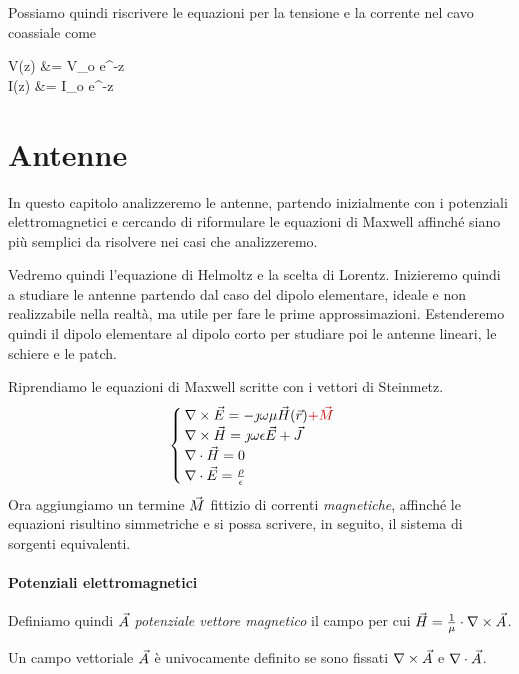 Possiamo quindi riscrivere le equazioni per la tensione e la corrente nel cavo coassiale come
\begin{esp}
	V(z) &= V_o \cdot e^{-\jmath \beta \cdot z}\\
	I(z) &= I_o \cdot e^{-\jmath \beta \cdot z}
\end{esp}

\chapter{Antenne}
In questo capitolo analizzeremo le antenne, partendo inizialmente con i potenziali elettromagnetici e cercando di riformulare le equazioni di Maxwell affinché siano più semplici da risolvere nei casi che analizzeremo.

Vedremo quindi l'equazione di Helmoltz e la scelta di Lorentz. Inizieremo quindi a studiare le antenne partendo dal caso del dipolo elementare, ideale e non realizzabile nella realtà, ma utile per fare le prime approssimazioni. Estenderemo quindi il dipolo elementare al dipolo corto per studiare poi le antenne lineari, le schiere e le patch.

Riprendiamo le equazioni di Maxwell scritte con i vettori di Steinmetz.
\begin{equation}\label{eq:maxw-ant}\begin{cases}
	\rot\E = -\jmath \omega \mu\H(\r) \textcolor[rgb]{0.8,0,0}{+ \M} \\
	\rot\H = \jmath \omega \epsilon \E + \J\\
	\diverg\H=0\\
	\diverg \E = \frac{\rho}{\epsilon}
\end{cases}\end{equation}
Ora aggiungiamo un termine $\vec{M}$ fittizio di correnti \emph{magnetiche}, affinché le equazioni risultino simmetriche e si possa scrivere, in seguito, il sistema di sorgenti equivalenti.

\subsubsection{Potenziali elettromagnetici}
Definiamo quindi $\vec{A}$ \emph{potenziale vettore magnetico} il campo per cui $\vec{H} = \frac{1}{\mu} \cdot \nabla\times \vec{A}$.

\begin{theorem}
	Un campo vettoriale $\vec{A}$ è univocamente definito se sono fissati $\nabla\times \vec{A}$ e $\nabla\cdot \vec{A}$.
\end{theorem}

